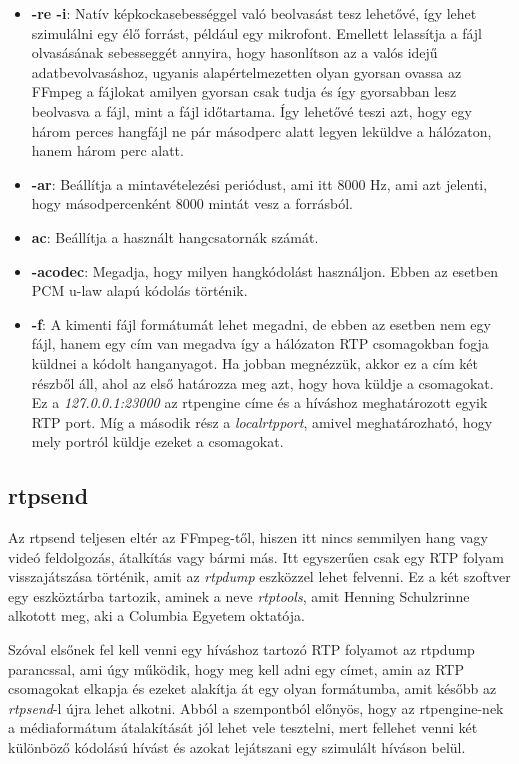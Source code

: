 \begin{itemize}
	\item \textbf{-re -i}: Natív képkockasebességgel való beolvasást tesz lehetővé, 
	így lehet szimulálni egy élő forrást, például egy mikrofont. Emellett lelassítja
	a fájl olvasásának sebesseggét annyira, hogy hasonlítson az a valós idejű
	adatbevolvasáshoz, ugyanis alapértelmezetten olyan gyorsan ovassa az FFmpeg a
	fájlokat amilyen gyorsan csak tudja és így gyorsabban lesz beolvasva a fájl,
	mint a fájl időtartama. 
	Így lehetővé teszi azt, hogy egy három perces hangfájl ne pár másodperc alatt 
	legyen leküldve a hálózaton, hanem három perc alatt. 
	\item \textbf{-ar}: Beállítja a mintavételezési periódust, ami itt 8000 Hz, ami 
	azt jelenti, hogy másodpercenként 8000 mintát vesz a forrásból. 
	\item \textbf{ac}: Beállítja a használt hangcsatornák számát.
	\item \textbf{-acodec}: Megadja, hogy milyen hangkódolást használjon. Ebben az 
	esetben PCM u-law alapú kódolás történik.
	\item \textbf{-f}: A kimenti fájl formátumát lehet megadni, de ebben az esetben
	nem egy fájl, hanem egy cím van megadva így a hálózaton RTP csomagokban fogja 
	küldnei a kódolt hanganyagot. Ha jobban megnézzük, akkor ez a cím két részből áll,
	ahol az első határozza meg azt, hogy hova küldje a csomagokat. Ez a 
	\textit{127.0.0.1:23000} az rtpengine címe és a híváshoz meghatározott egyik RTP
	port. Míg a második rész a \textit{localrtpport}, amivel meghatározható, hogy
	mely portról küldje ezeket a csomagokat.
\end{itemize}

\subsection{rtpsend}

Az rtpsend teljesen eltér az FFmpeg-től, hiszen itt nincs semmilyen hang vagy videó
feldolgozás, átalkítás vagy bármi más. Itt egyszerűen csak egy RTP folyam visszajátszása
történik, amit az \textit{rtpdump} eszközzel lehet felvenni. Ez a két szoftver egy 
eszköztárba tartozik, aminek a neve \textit{rtptools}, amit Henning Schulzrinne
alkotott meg, aki a Columbia Egyetem oktatója.

Szóval elsőnek fel kell venni egy híváshoz tartozó RTP folyamot az rtpdump parancssal,
ami úgy működik, hogy meg kell adni egy címet, amin az RTP csomagokat elkapja és 
ezeket alakítja át egy olyan formátumba, amit később az \textit{rtpsend}-l újra
lehet alkotni. Abból a szempontból előnyös, hogy az rtpengine-nek a médiaformátum
átalakítását jól lehet vele tesztelni, mert fellehet venni két különböző kódolású
hívást és azokat lejátszani egy szimulált híváson belül.

